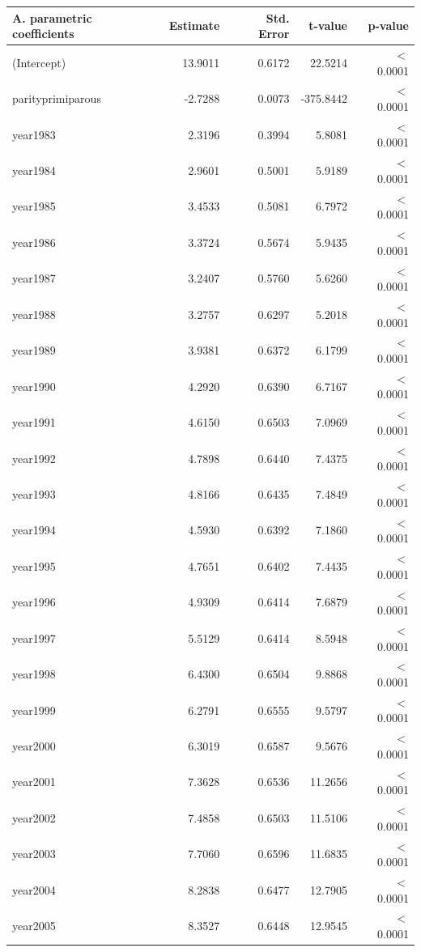 \begin{table}[ht]
\centering
\begin{tabular}{lrrrr}
\textbf{A. parametric coefficients} & Estimate & Std. Error & t-value & p-value \\ 
    \hline
    \hline
  (Intercept) & 13.9011 & 0.6172 & 22.5214 & $<$ 0.0001 \\ 
  parityprimiparous & -2.7288 & 0.0073 & -375.8442 & $<$ 0.0001 \\ 
  year1983 & 2.3196 & 0.3994 & 5.8081 & $<$ 0.0001 \\ 
  year1984 & 2.9601 & 0.5001 & 5.9189 & $<$ 0.0001 \\ 
  year1985 & 3.4533 & 0.5081 & 6.7972 & $<$ 0.0001 \\ 
  year1986 & 3.3724 & 0.5674 & 5.9435 & $<$ 0.0001 \\ 
  year1987 & 3.2407 & 0.5760 & 5.6260 & $<$ 0.0001 \\ 
  year1988 & 3.2757 & 0.6297 & 5.2018 & $<$ 0.0001 \\ 
  year1989 & 3.9381 & 0.6372 & 6.1799 & $<$ 0.0001 \\ 
  year1990 & 4.2920 & 0.6390 & 6.7167 & $<$ 0.0001 \\ 
  year1991 & 4.6150 & 0.6503 & 7.0969 & $<$ 0.0001 \\ 
  year1992 & 4.7898 & 0.6440 & 7.4375 & $<$ 0.0001 \\ 
  year1993 & 4.8166 & 0.6435 & 7.4849 & $<$ 0.0001 \\ 
  year1994 & 4.5930 & 0.6392 & 7.1860 & $<$ 0.0001 \\ 
  year1995 & 4.7651 & 0.6402 & 7.4435 & $<$ 0.0001 \\ 
  year1996 & 4.9309 & 0.6414 & 7.6879 & $<$ 0.0001 \\ 
  year1997 & 5.5129 & 0.6414 & 8.5948 & $<$ 0.0001 \\ 
  year1998 & 6.4300 & 0.6504 & 9.8868 & $<$ 0.0001 \\ 
  year1999 & 6.2791 & 0.6555 & 9.5797 & $<$ 0.0001 \\ 
  year2000 & 6.3019 & 0.6587 & 9.5676 & $<$ 0.0001 \\ 
  year2001 & 7.3628 & 0.6536 & 11.2656 & $<$ 0.0001 \\ 
  year2002 & 7.4858 & 0.6503 & 11.5106 & $<$ 0.0001 \\ 
  year2003 & 7.7060 & 0.6596 & 11.6835 & $<$ 0.0001 \\ 
  year2004 & 8.2838 & 0.6477 & 12.7905 & $<$ 0.0001 \\ 
  year2005 & 8.3527 & 0.6448 & 12.9545 & $<$ 0.0001 \\ 

\end{tabular}
\end{table}
